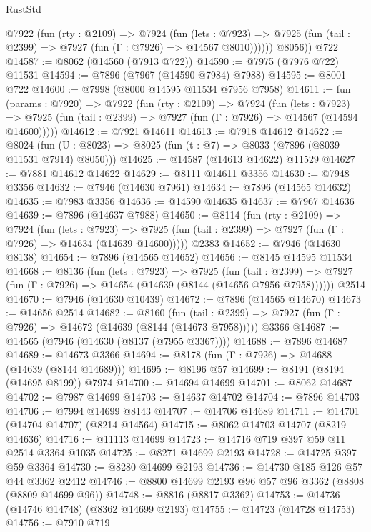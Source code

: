 \begin{lexlean}{RustStd}
\begin{coremodule}
{\begin{coremodule}
{{{{{{{{{{{{{{{{{{{{{{{{{{{{{{{{{{{{{{{{{{{{{{{{{{          @7922
            (fun (rty : @2109) =>
            @7924
              (fun (lets : @7923) =>
              @7925 (fun (tail : @2399) => @7927 (fun (Γ : @7926) => @14567 @8010))))))
        @8056))
    @722
@14587 := @8062 (@14560 (@7913 @722))
@14590 := @7975 (@7976 @722) @11531
@14594 := @7896 (@7967 (@14590 @7984) @7988)
@14595 := @8001 @722
@14600 := @7998 (@8000 @14595 @11534 @7956 @7958)
@14611 := fun (params : @7920) =>
  @7922
    (fun (rty : @2109) =>
    @7924
      (fun (lets : @7923) =>
      @7925 (fun (tail : @2399) => @7927 (fun (Γ : @7926) => @14567 (@14594 @14600)))))
@14612 := @7921 @14611
@14613 := @7918 @14612
@14622 := @8024
    (fun (U : @8023) => @8025 (fun (t : @7) => @8033 (@7896 (@8039 @11531 @7914) @8050)))
@14625 := @14587 (@14613 @14622) @11529
@14627 := @7881 @14612 @14622
@14629 := @8111 @14611 @3356
@14630 := @7948 @3356
@14632 := @7946 (@14630 @7961)
@14634 := @7896 (@14565 @14632)
@14635 := @7983 @3356
@14636 := @14590 @14635
@14637 := @7967 @14636
@14639 := @7896 (@14637 @7988)
@14650 := @8114
    (fun (rty : @2109) =>
    @7924
      (fun (lets : @7923) =>
      @7925 (fun (tail : @2399) => @7927 (fun (Γ : @7926) => @14634 (@14639 @14600)))))
    @2383
@14652 := @7946 (@14630 @8138)
@14654 := @7896 (@14565 @14652)
@14656 := @8145 @14595 @11534
@14668 := @8136
    (fun (lets : @7923) =>
    @7925
      (fun (tail : @2399) =>
      @7927 (fun (Γ : @7926) => @14654 (@14639 (@8144 (@14656 @7956 @7958))))))
    @2514
@14670 := @7946 (@14630 @10439)
@14672 := @7896 (@14565 @14670)
@14673 := @14656 @2514
@14682 := @8160
    (fun (tail : @2399) => @7927 (fun (Γ : @7926) => @14672 (@14639 (@8144 (@14673 @7958)))))
    @3366
@14687 := @14565 (@7946 (@14630 (@8137 (@7955 @3367))))
@14688 := @7896 @14687
@14689 := @14673 @3366
@14694 := @8178 (fun (Γ : @7926) => @14688 (@14639 (@8144 @14689)))
@14695 := @8196 @57
@14699 := @8191 (@8194 (@14695 @8199)) @7974
@14700 := @14694 @14699
@14701 := @8062 @14687
@14702 := @7987 @14699
@14703 := @14637 @14702
@14704 := @7896 @14703
@14706 := @7994 @14699 @8143
@14707 := @14706 @14689
@14711 := @14701 (@14704 @14707) (@8214 @14564)
@14715 := @8062 @14703 @14707 (@8219 @14636)
@14716 := @11113 @14699
@14723 := @14716 @719 @397 @59 @11 @2514 @3364 @1035
@14725 := @8271 @14699 @2193
@14728 := @14725 @397 @59 @3364
@14730 := @8280 @14699 @2193
@14736 := @14730 @185 @126 @57 @44 @3362 @2412
@14746 := @8800 @14699 @2193 @96 @57 @96 @3362 (@8808 (@8809 @14699 @96))
@14748 := @8816 (@8817 @3362)
@14753 := @14736 (@14746 @14748) (@8362 @14699 @2193)
@14755 := @14723 (@14728 @14753)
@14756 := @7910 @719
}}}}}}}}}}}}}}}}}}}}}}}}}}}}}}}}}}}}}}}}}}}}}}}}}}
\end{coremodule}}
\end{coremodule}
\end{lexlean}

